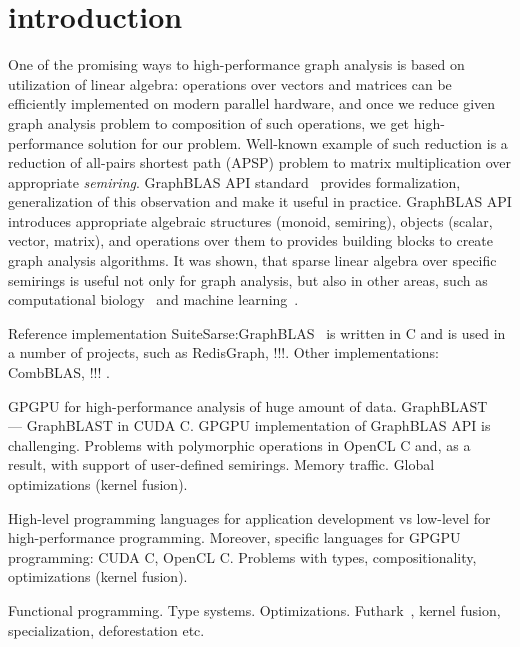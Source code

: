 \section{introduction}

One of the promising ways to high-performance graph analysis is based on utilization of linear algebra: operations over vectors and matrices can be efficiently implemented on modern parallel hardware, and once we reduce given graph analysis problem to composition of such operations, we get high-performance solution for our problem. 
Well-known example of such reduction is a reduction of all-pairs shortest path (APSP) problem to matrix multiplication over appropriate \textit{semiring}.
GraphBLAS API standard~\cite{7761646} provides formalization, generalization of this observation and make it useful in practice. 
GraphBLAS API introduces appropriate algebraic structures (monoid, semiring), objects (scalar, vector, matrix), and operations over them to provides building blocks to create graph analysis algorithms.
It was shown, that sparse linear algebra over specific semirings is useful not only for graph analysis, but also in other areas, such as computational biology~\cite{10.5555/3433701.3433800} and machine learning~\cite{8091098}.

Reference implementation SuiteSarse:GraphBLAS~\cite{10.1145/3322125} is written in C and is used in a number of projects, such as RedisGraph, !!!.
Other implementations: CombBLAS, !!! .

GPGPU for high-performance analysis of huge amount of data. 
GraphBLAST~\cite{yang2019graphblast} --- GraphBLAST in CUDA C. 
GPGPU implementation of GraphBLAS API is challenging. 
Problems with polymorphic operations in OpenCL C and, as a result, with support of user-defined semirings.
Memory traffic.
Global optimizations (kernel fusion).

High-level programming languages for application development vs low-level for high-performance programming.
Moreover, specific languages for GPGPU programming: CUDA C, OpenCL C.
Problems with types, compositionality, optimizations (kernel fusion).

Functional programming. 
Type systems.
Optimizations.
Futhark~\cite{Henriksen:2017:FPF:3062341.3062354}, kernel fusion, specialization, deforestation etc. 


